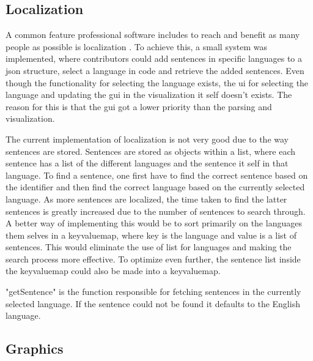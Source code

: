 \subsection{Localization}



A common feature professional software includes to reach and benefit as many people as possible is \gls{localization} \cite{souphavanh2005localization}. To achieve this, a small system was implemented, where contributors could add sentences in specific languages to a \gls{json} structure, select a language in code and retrieve the added sentences. Even though the functionality for selecting the language exists, the \gls{ui} for selecting the language and updating the \gls{gui} in the visualization it self doesn't exists. The reason for this is that the \gls{gui} got a lower priority than the parsing and visualization. 

The current implementation of \gls{localization} is not very good due to the way sentences are stored. Sentences are stored as objects within a list, where each sentence has a list of the different languages and the sentence it self in that language. To find a sentence, one first have to find the correct sentence based on the identifier and then find the correct language based on the currently selected language. As more sentences are localized, the time taken to find the latter sentences is greatly increased due to the number of sentences to search through. A better way of implementing this would be to sort primarily on the languages them selves in a \gls{keyvaluemap}, where key is the language and value is a list of sentences. This would eliminate the use of list for languages and making the search process more effective. To optimize even further, the sentence list inside the \gls{keyvaluemap} could also be made into a \gls{keyvaluemap}. 

"getSentence" is the function responsible for fetching sentences in the currently selected language. If the sentence could not be found it defaults to the English language. 

\subsection{Graphics}

